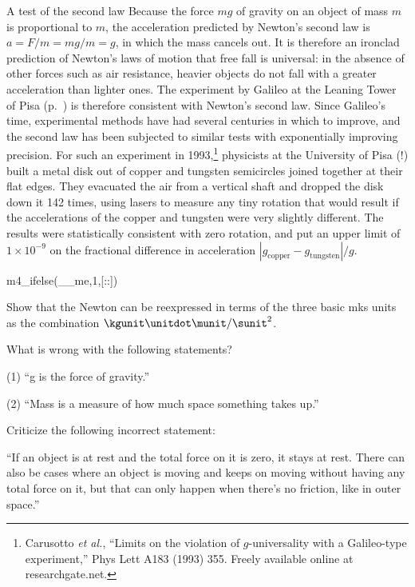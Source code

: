 \begin{eg}{A test of the second law}\label{eg:carusotto}
Because the force $mg$ of gravity on an object of mass $m$ is proportional to $m$,
the acceleration predicted by Newton's second law is $a=F/m=mg/m=g$, in which the mass
cancels out. It is therefore an ironclad prediction of Newton's laws of motion that
free fall is universal: in the absence of other forces such as air resistance,
heavier objects do not fall with a greater acceleration than lighter ones. 
The experiment by Galileo at the Leaning Tower of Pisa (p.~\pageref{fig:galileo-drops-balls})
is therefore consistent with Newton's second law. Since Galileo's time, experimental methods
have had several centuries in which to improve, and the second law has been subjected to similar
tests with exponentially improving precision. For such an experiment in 
1993,\footnote{Carusotto \emph{et al.}, ``Limits on the violation of $g$-universality with a
Galileo-type experiment,'' Phys Lett A183 (1993) 355. Freely available online at
researchgate.net.} physicists at the University of Pisa (!) built a metal disk out of
copper and tungsten semicircles joined together at their flat edges. They evacuated the air
from a vertical shaft and dropped the disk down it 142 times, using lasers to measure any
tiny rotation that would result if the accelerations of the copper and tungsten were very slightly
different. The results were statistically consistent with zero rotation, and put an upper limit
of $1\times10^{-9}$ on the fractional difference in acceleration $|g_\text{copper}-g_{\text{tungsten}}|/g$.
\end{eg}

m4_ifelse(__me,1,[:\pagebreak[4]:])

\startdqs

\begin{dq}
Show that the Newton can be reexpressed in terms of the
three basic mks units as the combination $\kgunit\unitdot\munit/\sunit^2$.
\end{dq}

\begin{dq}
What is wrong with the following statements?

    (1) ``g is the force of gravity.''

    (2) ``Mass is a measure of how much space something takes up.''
\end{dq}

\begin{dq}
Criticize the following incorrect statement:

``If an object is at rest and the total force on it is zero,
it stays at rest. There can also be cases where an object is
moving and keeps on moving without having any total force on
it, but that can only happen when there's no friction,
like in outer space.''
\end{dq}

